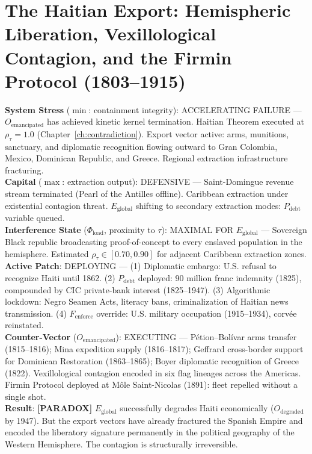\chapter{The Haitian Export: Hemispheric Liberation, Vexillological Contagion, and the Firmin Protocol (1803--1915)}
\label{ch:haitian_export}

\begin{tcolorbox}[colback=black!5, colframe=black!70, fonttitle=\bfseries\ttfamily,
  title=RUNTIME LOG: HAITI (1803--1915 CE){,} OUT-GROUP EXPORT VECTOR ACTIVE]
\ttfamily\small
\textbf{System Stress} ($\min$: containment integrity): ACCELERATING FAILURE --- $O_{\text{emancipated}}$ has achieved kinetic kernel termination. Haitian Theorem executed at $\rho_{\tau} = 1.0$ (Chapter~\ref{ch:contradiction}). Export vector active: arms, munitions, sanctuary, and diplomatic recognition flowing outward to Gran Colombia, Mexico, Dominican Republic, and Greece. Regional extraction infrastructure fracturing.\\
\textbf{Capital} ($\max$: extraction output): DEFENSIVE --- Saint-Domingue revenue stream terminated (Pearl of the Antilles offline). Caribbean extraction under existential contagion threat. $E_{\text{global}}$ shifting to secondary extraction modes: $P_{\text{debt}}$ variable queued.\\
\textbf{Interference State} ($\Phi_{\text{load}}$, proximity to $\tau$): MAXIMAL FOR $E_{\text{global}}$ --- Sovereign Black republic broadcasting proof-of-concept to every enslaved population in the hemisphere. Estimated $\rho_{\tau} \in [0.70, 0.90]$ for adjacent Caribbean extraction zones.\\
\textbf{Active Patch}: DEPLOYING --- (1) Diplomatic embargo: U.S. refusal to recognize Haiti until 1862. (2) $P_{\text{debt}}$ deployed: 90 million franc indemnity (1825), compounded by CIC private-bank interest (1825--1947). (3) Algorithmic lockdown: Negro Seamen Acts, literacy bans, criminalization of Haitian news transmission. (4) $F_{\text{enforce}}$ override: U.S. military occupation (1915--1934), corv\'{e}e reinstated.\\
\textbf{Counter-Vector} ($O_{\text{emancipated}}$): EXECUTING --- Pétion–Bolívar arms transfer (1815--1816); Mina expedition supply (1816--1817); Geffrard cross-border support for Dominican Restoration (1863--1865); Boyer diplomatic recognition of Greece (1822). Vexillological contagion encoded in six flag lineages across the Americas. Firmin Protocol deployed at Môle Saint-Nicolas (1891): fleet repelled without a single shot.\\
\textbf{Result}: \textbf{[PARADOX]} $E_{\text{global}}$ successfully degrades Haiti economically ($O_{\text{degraded}}$ by 1947). But the export vectors have already fractured the Spanish Empire and encoded the liberatory signature permanently in the political geography of the Western Hemisphere. The contagion is structurally irreversible.
\end{tcolorbox}

